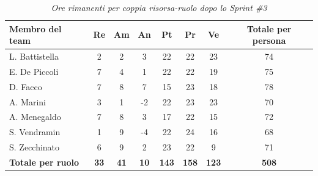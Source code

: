 ﻿\documentclass[a4paper, 10pt, colorlinks=true, linkcolor=black, urlcolor=blue, citecolor=blue, hidelinks]{article}
\renewcommand{\arraystretch}{1.2}
\begin{document}
\begin{table}[H]
    \centering
    \renewcommand{\arraystretch}{1.4}
    \begin{tabular}{|l|c|c|c|c|c|c|c|}
        \hline
        \rowcolor{bluBitless!15}
        \textbf{Membro del team} & \textbf{Re} & \textbf{Am} & \textbf{An} & \textbf{Pt} & \textbf{Pr} & \textbf{Ve} & \textbf{Totale per persona} \\
        \hline
        L. Battistella & 2 & 2 & 3 & 22 & 22 & 23 & 74 \\ \hline
        E. De Piccoli & 7 & 4 & 1 & 22 & 22 & 19 & 75 \\ \hline
        D. Facco & 7 & 8 & 7 & 15 & 23 & 18 & 78 \\ \hline
        A. Marini & 3 & 1 & -2 & 22 & 23 & 23 & 70 \\ \hline
        A. Menegaldo & 7 & 8 & 3 & 17 & 22 & 15 & 72 \\ \hline
        S. Vendramin & 1 & 9 & -4 & 22 & 24 & 16 & 68 \\ \hline
        S. Zecchinato & 6 & 9 & 2 & 23 & 22 & 9 & 71 \\ \hline
        \rowcolor{bluBitless!8}
        \textbf{Totale per ruolo} & \textbf{33} & \textbf{41} & \textbf{10} & \textbf{143} & \textbf{158} & \textbf{123} & \textbf{508} \\
        \hline
    \end{tabular}
    \caption{\textit{Ore rimanenti per coppia risorsa-ruolo dopo lo Sprint \#3}}
\end{table}
\end{document}
